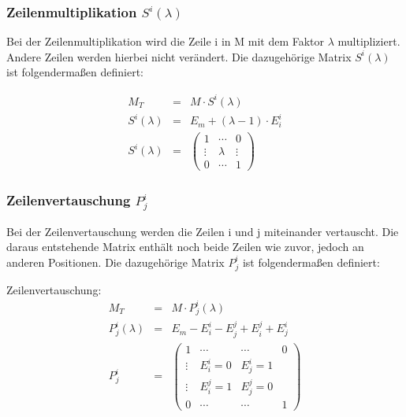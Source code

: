 \subsubsection{Zeilenmultiplikation $S^i(\lambda)$}
Bei der Zeilenmultiplikation wird die Zeile i in M mit dem Faktor $\lambda$ multipliziert. Andere Zeilen werden hierbei nicht verändert. Die dazugehörige Matrix $S^i(\lambda)$ ist folgendermaßen definiert:
\begin{Def}
\begin{eqnarray}
	M_T &=& M \cdot S^i(\lambda) \\
	S^i(\lambda) &=& E_m + (\lambda - 1) \cdot E^i_i \\
	S^i(\lambda) &=& 
	\begin{pmatrix}
	1 & \cdots & 0 \\ 
	\vdots & \lambda & \vdots \\ 
	0 & \cdots & 1
	\end{pmatrix} 
\end{eqnarray}
\end{Def}

\subsubsection{Zeilenvertauschung $P^i_j$}
Bei der Zeilenvertauschung werden die Zeilen i und j miteinander vertauscht. Die daraus entstehende Matrix enthält noch beide Zeilen wie zuvor, jedoch an anderen Positionen. Die dazugehörige Matrix $P^i_j$ ist folgendermaßen definiert:
\begin{Def} Zeilenvertauschung:
\begin{eqnarray}
	M_T &=& M \cdot P_j^i(\lambda) \\
	P_j^i(\lambda) &=& E_m - E^i_i - E^j_j + E^j_i + E^i_j \\
	P^i_j &=& 
	\begin{pmatrix}
	1 & \cdots & \cdots & 0 \\ 
	\vdots & E^i_i = 0 & E^i_j = 1 &  \\ 
	\vdots & E^j_i = 1 & E^j_j = 0 &  \\ 
	0 & \cdots & \cdots & 1
	\end{pmatrix} 
\end{eqnarray}
\end{Def}